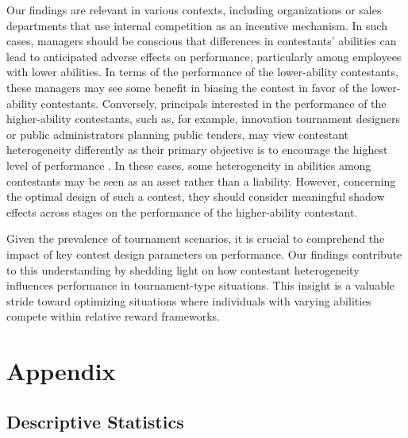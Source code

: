 \documentclass[11pt,a4paper]{article}
\let\Oldsection\section
\renewcommand{\section}{\FloatBarrier\Oldsection}
\newcommand{\beginappa}{%
        \setcounter{page}{1}
        \setcounter{table}{0}
        \renewcommand{\thetable}{A.\arabic{table}}%
        \setcounter{figure}{0}
        \renewcommand{\thefigure}{A.\arabic{figure}}
        \setcounter{subsection}{0}
        \renewcommand{\thesubsection}{\mbox{A.\arabic{subsection}}}
     }
\begin{document}
Our findings are relevant in various contexts, including organizations or sales departments that use internal competition as an incentive mechanism. In such cases, managers should be conscious that differences in contestants' abilities can lead to anticipated adverse effects on performance, particularly among employees with lower abilities. In terms of the performance of the lower-ability contestants, these managers may see some benefit in biasing the contest in favor of the lower-ability contestants. Conversely, principals interested in the performance of the higher-ability contestants, such as, for example, innovation tournament designers or public administrators planning public tenders, may view contestant heterogeneity differently as their primary objective is to encourage the highest level of performance \cite{Terwiesch.2009b}. In these cases, some heterogeneity in abilities among contestants may be seen as an asset rather than a liability. However, concerning the optimal design of such a contest, they should consider meaningful shadow effects across stages on the performance of the higher-ability contestant. \par

Given the prevalence of tournament scenarios, it is crucial to comprehend the impact of key contest design parameters on performance. Our findings contribute to this understanding by shedding light on how contestant heterogeneity influences performance in tournament-type situations. This insight is a valuable stride toward optimizing situations where individuals with varying abilities compete within relative reward frameworks.\par



\newpage



\vfill



\newpage
\appendix
\beginappa
\section{Appendix}\label{sec:app}

\subsection{Descriptive Statistics}\label{subsec:app_desc}
\end{document}
